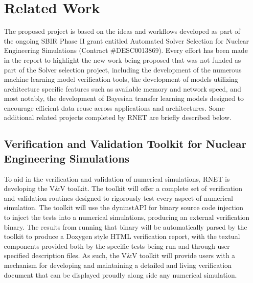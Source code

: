 
\section{Related Work}
\label{related}

The proposed project is based on the ideas and workflows developed as part of the ongoing SBIR Phase II grant entitled Automated Solver Selection for Nuclear Engineering Simulations (Contract \#DESC0013869). Every effort has been made in the report to highlight the new work being proposed that was not funded as part of the Solver selection project, including the development of the numerous machine learning model verification tools, the development of models utilizing architecture specific features such as available memory and network speed, and most notably, the development of Bayesian transfer learning models designed to encourage efficient data reuse across applications and architectures. Some additional related projects completed by RNET are briefly described below. 

\subsection{Verification and Validation Toolkit for Nuclear Engineering Simulations} 
  To aid in the verification and validation of numerical simulations, RNET is developing the V\&V toolkit. The toolkit will offer a complete set of verification and validation routines designed to rigorously test every aspect of numerical simulation. The toolkit will use the dyninstAPI for binary source code injection to inject the tests into a numerical simulations, producing an external verification binary. The results from running that binary will be automatically parsed by the toolkit to produce a Doxygen style HTML verification report, with the textual components provided both by the specific tests being run and through user specified description files. As such, the V\&V toolkit will provide users with a mechanism for developing and maintaining a detailed and living verification document that can be displayed proudly along side any numerical simulation.     

